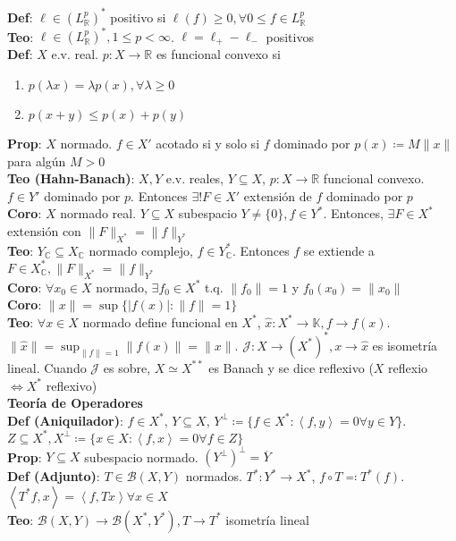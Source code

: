 \documentclass[9pt, letterpaper]{extarticle}
\newcommand{\C}{\mathbb{C}}
\newcommand{\R}{\mathbb{R}}
\newcommand{\K}{\mathbb{K}}
\newcommand{\inn}[1]{\left\langle #1\right\rangle}
\begin{document}
\begin{multicols*}{2}
\textbf{Def}: $\ell\in (L^p_\R)^*$ positivo si $\ell(f)\geq 0,\forall 0\leq f\in L^p_\R$\\
\textbf{Teo}: $\ell\in (L^p_\R)^*,1\leq p<\infty$. $\ell=\ell_+-\ell_{-}$ positivos\\
\textbf{Def}: $X$ e.v. real. $p:X\to\R$ es funcional convexo si\begin{enumerate}
	\item $p(\lambda x)=\lambda p(x),\forall \lambda\geq 0$
	\item $p(x+y)\leq p(x)+p(y)$
\end{enumerate}
\textbf{Prop}: $X$ normado. $f\in X'$ acotado si y solo si $f$ dominado por $p(x)\coloneqq M\|x\|$ para algún $M>0$\\
\textbf{\color{red}Teo (Hahn-Banach)}: $X,Y$ e.v. reales, $Y\subseteq X$, $p:X\to\R$ funcional convexo. $f\in Y'$ dominado por $p$. Entonces $\exists! F\in X'$ extensión de $f$ dominado por $p$\\
\textbf{Coro}: $X$ normado real. $Y\subseteq X$ subespacio $Y\neq \{0\},f\in Y^*$. Entonces, $\exists F\in X^*$ extensión con $\|F\|_{X^*}=\|f\|_{Y^*}$\\
\textbf{Teo}: $Y_\C\subseteq X_\C$ normado complejo, $f\in Y_\C^*$. Entonces $f$ se extiende a $F\in X_\C^*, \|F\|_{X^*}=\|f\|_{Y^*}$\\
\textbf{Coro}: $\forall x_0\in X$ normado, $\exists f_0\in X^*$ t.q. $\|f_0\|=1$ y $f_0(x_0)=\|x_0\|$\\
\textbf{Coro}: $\|x\|=\sup\{|f(x)|:\|f\|=1\}$\\
\textbf{Teo}: $\forall x\in X$ normado define funcional en $X^*$, $\hat x:X^*\to\K, f\to f(x)$. $\|\hat x\|=\sup_{\|f\|=1}\|f(x)\|=\|x\|$. $\mathcal{J}:X\to (X^*)^*, x\to\hat x$ es isometría lineal. Cuando $\mathcal{J}$ es sobre, $X\simeq X^{**}$ es Banach y se dice reflexivo ($X$ reflexio $\iff X^*$ reflexivo)\\
\textbf{Teoría de Operadores}\\
\textbf{Def (Aniquilador)}: $f\in X^*$, $Y\subseteq X$, $Y^\perp\coloneqq \{f\in X^*:\inn{f,y}=0\forall y\in Y\}$. $Z\subseteq X^*, X^\perp\coloneqq \{x\in X:\inn{f,x}=0\forall f\in Z\}$\\
\textbf{Prop}: $Y\subseteq X$ subespacio normado. $(Y^\perp)^\perp=\overline{Y}$\\
\textbf{Def (Adjunto)}: $T\in\mathcal{B}(X,Y)$ normados. $T^*:Y^*\to X^*$, $f\circ T\eqqcolon T^*(f)$. $\inn{T^* f,x}=\inn{f, Tx}\forall x\in X$\\
\textbf{Teo}: $\mathcal{B}(X,Y)\to\mathcal{B}(X^*,Y^*), T\to T^*$ isometría lineal\begin{enumerate}

\end{enumerate}
\end{multicols*}
\end{document}
